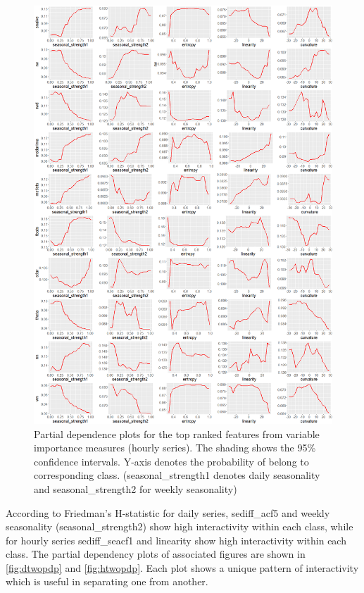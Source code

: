\documentclass[11pt,a4paper,]{article}
\begin{document}
\begin{figure}
\centering
\includegraphics{figures/hourlypdp-1.png}
\caption{\label{fig:hourlypdp}Partial dependence plots for the top ranked
features from variable importance measures (hourly series). The shading
shows the 95\% confidence intervals. Y-axis denotes the probability of
belong to corresponding class. (seasonal\_strength1 denotes daily
seasonality and seasonal\_strength2 for weekly seasonality)}
\end{figure}

According to Friedman's H-statistic for daily series, sediff\_acf5 and
weekly seasonality (seasonal\_strength2) show high interactivity within
each class, while for hourly series sediff\_seacf1 and linearity show
high interactivity within each class. The partial dependency plots of
associated figures are shown in \autoref{fig:dtwopdp} and
\autoref{fig:htwopdp}. Each plot shows a unique pattern of interactivity
which is useful in separating one from another.
\end{document}
